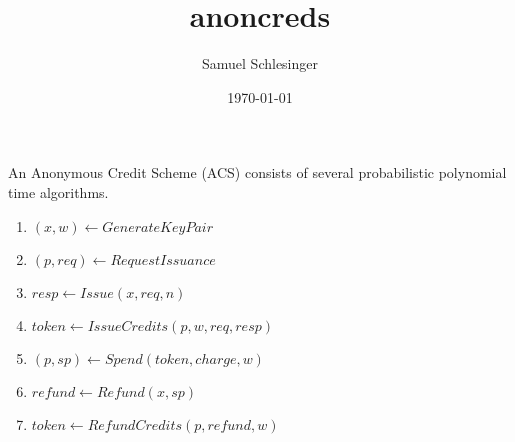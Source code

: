 \documentclass{article}
\title{anoncreds}
\author{Samuel Schlesinger}
\date{\today}
\begin{document}
\maketitle

An Anonymous Credit Scheme (ACS) consists of several probabilistic polynomial time algorithms. 

\begin{enumerate}
    \item $(x, w) \leftarrow GenerateKeyPair$
    \item $(p, req) \leftarrow RequestIssuance$
    \item $resp \leftarrow Issue(x, req, n)$
    \item $token \leftarrow IssueCredits(p, w, req, resp)$
    \item $(p, sp) \leftarrow Spend(token, charge, w)$
    \item $refund \leftarrow Refund(x, sp)$
    \item $token \leftarrow RefundCredits(p, refund, w)$
\end{enumerate}
\end{document}
